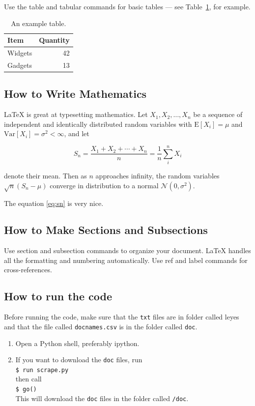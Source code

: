 \documentclass[letterpaper]{article}
\begin{document}
Use the table and tabular commands for basic tables --- see Table~\ref{tab:widgets}, for example.

\begin{table}
\centering
\begin{tabular}{l|r}
Item & Quantity \\\hline
Widgets & 42 \\
Gadgets & 13
\end{tabular}
\caption{\label{tab:widgets}An example table.}
\end{table}

\subsection{How to Write Mathematics}

\LaTeX{} is great at typesetting mathematics. Let $X_1, X_2, \ldots, X_n$ be a sequence of independent and identically distributed random variables with $\text{E}[X_i] = \mu$ and $\text{Var}[X_i] = \sigma^2 < \infty$, and let

\begin{equation}
S_n = \frac{X_1 + X_2 + \cdots + X_n}{n}
      = \frac{1}{n}\sum_{i}^{n} X_i
\label{eq:sn}
\end{equation}

denote their mean. Then as $n$ approaches infinity, the random variables $\sqrt{n}(S_n - \mu)$ converge in distribution to a normal $\mathcal{N}(0, \sigma^2)$.

The equation \ref{eq:sn} is very nice.

\subsection{How to Make Sections and Subsections}

Use section and subsection commands to organize your document. \LaTeX{} handles all the formatting and numbering automatically. Use ref and label commands for cross-references.

\subsection{How to run the code}

Before running the code, make sure that the \texttt{txt} files are in folder called leyes and that the file called \texttt{docnames.csv} is in the folder called \texttt{doc}.

\begin{enumerate}
\item Open a Python shell, preferably ipython.
\item If you want to download the \texttt{doc} files, run \\ \texttt{\$ run scrape.py} \\ then call \\ \texttt{\$ go()} \\ This will download the \texttt{doc} files in the folder called \texttt{/doc}.
\end{enumerate}
\end{document}

